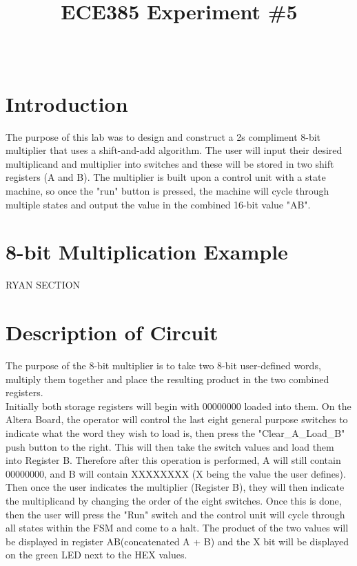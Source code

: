 \documentclass[journal, twocolumn, final,11pt,letterpaper]{IEEEtran}
\title{ECE385 Experiment \#5
	}
\author{
\IEEEauthorblockN{Eric Meyers, Ryan Helsdingen}\\
\IEEEauthorblockA{Section ABG; TAs: Ben Delay, Shuo Liu \\
February 24th, 2016 \\
emeyer7, helsdin2}}
\begin{document}
	
\maketitle
\singlespacing

\section{Introduction}
The purpose of this lab was to design and construct a 2s compliment 8-bit multiplier that uses a shift-and-add algorithm. The user will input their desired multiplicand and multiplier into switches and these will be stored in two shift registers (A and B). The multiplier is built upon a control unit with a state machine, so once the "run" button is pressed, the machine will cycle through multiple states and output the value in the combined 16-bit value "AB".

\section{8-bit Multiplication Example}
RYAN SECTION

\section{Description of Circuit}
The purpose of the 8-bit multiplier is to take two 8-bit user-defined words, multiply them together and place the resulting product in the two combined registers. \\

Initially both storage registers will begin with 00000000 loaded into them. On the Altera Board, the operator will control the last eight general purpose switches to indicate what the word they wish to load is, then press the "Clear\_A\_Load\_B" push button to the right. This will then take the switch values and load them into Register B. Therefore after this operation is performed, A will still contain 00000000, and B will contain XXXXXXXX (X being the value the user defines).\\

Then once the user indicates the multiplier (Register B), they will then indicate the multiplicand by changing the order of the eight switches. Once this is done, then the user will press the "Run" switch and the control unit will cycle through all states within the FSM and come to a halt. The product of the two values will be displayed in register AB(concatenated A + B) and the X bit will be displayed on the green LED next to the HEX values. \\
\end{document}
